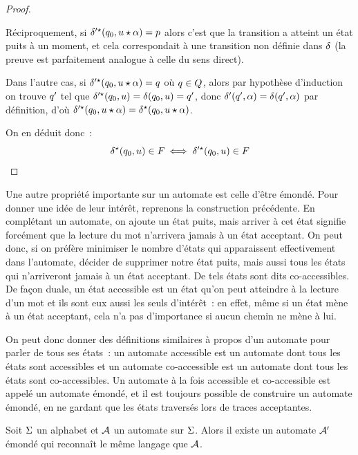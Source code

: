 \begin{proof}
\begin{itemize}
    Réciproquement, si $\delta_{}'^{\star}(q_{0},u\mathbin{\star}\alpha) = p$ alors c'est
    que la transition a atteint un état puits à un moment, et cela correspondait
    à une transition non définie dans $\delta_{}$ (la preuve est parfaitement
    analogue à celle du sens direct).

    Dans l'autre cas, si $\delta_{}'^{\star}(q_{0},u\mathbin{\star}\alpha) = q_{}$ où
    $q_{} \in Q_{}$, alors par hypothèse d'induction on trouve $q_{}'$ tel
    que $\delta_{}'^{\star}(q_{0},u) = \delta_{}(q_{0},u) = q_{}'$, donc
    $\delta_{}'(q_{}',\alpha) = \delta_{}(q_{}',\alpha)$ par définition, d'où
    $\delta_{}'^{\star}(q_{0},u\mathbin{\star}\alpha)=\delta_{}^{\star}(q_{0},u\mathbin{\star}\alpha)$.
  \end{itemize}

  On en déduit donc~:
  \[\delta_{}^{\star}(q_{0},u) \in F_{} \iff \delta_{}'^{\star}(q_{0},u)\in F_{}
  \qedhere\]
\end{proof}

Une autre propriété importante sur un automate est celle d'être émondé.
Pour donner une idée de leur intérêt, reprenons la construction précédente.
En complétant un automate, on ajoute un état puits, mais arriver à cet état
signifie forcément que la lecture du mot n'arrivera jamais à un état acceptant.
On peut donc, si on préfère minimiser le nombre d'états qui apparaissent
effectivement dans l'automate, décider de supprimer notre état puits, mais aussi
tous les états qui n'arriveront jamais à un état acceptant. De tels états sont
dits co-accessibles. De façon duale, un état accessible est un état qu'on peut
atteindre à la lecture d'un mot et ils sont eux aussi les seuls d'intérêt~:
en effet, même si un état mène à un état acceptant, cela n'a pas d'importance
si aucun chemin ne mène à lui.

On peut donc donner des définitions similaires à propos d'un automate pour
parler de tous ses états~: un automate accessible est un automate dont tous les
états sont accessibles et un automate co-accessible est un automate dont tous
les états sont co-accessibles. Un automate à la fois accessible et co-accessible
est appelé un automate émondé, et il est toujours possible de construire un
automate émondé, en ne gardant que les états traversés lors de traces
acceptantes.

\begin{proposition}
  Soit $\Sigma$ un alphabet et $\mathcal{A}$ un automate sur $\Sigma$. Alors il existe
  un automate $\mathcal{A}'$ émondé qui reconnaît le même langage que $\mathcal{A}$.
\end{proposition}

